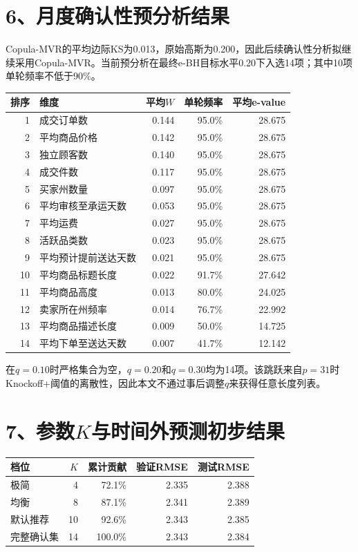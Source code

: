 \documentclass[UTF8,12pt,a4paper]{ctexart}
\begin{document}
\newpage
\section*{6、月度确认性预分析结果}

Copula-MVR的平均边际KS为0.013，原始高斯为0.200，因此后续确认性分析拟继续采用Copula-MVR。当前预分析在最终e-BH目标水平0.20下入选14项；其中10项单轮频率不低于90\%。

\begin{center}
\scriptsize
\renewcommand{\arraystretch}{1.12}
\begin{tabular}{r l r r r}
\toprule
排序 & 维度 & 平均$W$ & 单轮频率 & 平均e-value\\
\midrule
1 & 成交订单数 & 0.144 & 95.0\% & 28.675\\
2 & 平均商品价格 & 0.142 & 95.0\% & 28.675\\
3 & 独立顾客数 & 0.140 & 95.0\% & 28.675\\
4 & 成交件数 & 0.117 & 95.0\% & 28.675\\
5 & 买家州数量 & 0.097 & 95.0\% & 28.675\\
6 & 平均审核至承运天数 & 0.053 & 95.0\% & 28.675\\
7 & 平均运费 & 0.027 & 95.0\% & 28.675\\
8 & 活跃品类数 & 0.023 & 95.0\% & 28.675\\
9 & 平均预计提前送达天数 & 0.021 & 95.0\% & 28.675\\
10 & 平均商品标题长度 & 0.022 & 91.7\% & 27.642\\
11 & 平均商品高度 & 0.013 & 80.0\% & 24.025\\
12 & 卖家所在州频率 & 0.014 & 76.7\% & 22.992\\
13 & 平均商品描述长度 & 0.009 & 50.0\% & 14.725\\
14 & 平均下单至送达天数 & 0.007 & 41.7\% & 12.142\\
\bottomrule
\end{tabular}
\end{center}

在$q=0.10$时严格集合为空，$q=0.20$和$q=0.30$均为14项。该跳跃来自$p=31$时Knockoff+阈值的离散性，因此本文不通过事后调整$q$来获得任意长度列表。

\newpage
\section*{7、参数$K$与时间外预测初步结果}

\begin{center}
\small
\begin{tabular}{lrrrr}
\toprule
档位 & $K$ & 累计贡献 & 验证RMSE & 测试RMSE\\
\midrule
极简 & 4 & 72.1\% & 2.335 & 2.388\\
均衡 & 8 & 87.1\% & 2.341 & 2.389\\
默认推荐 & 10 & 92.6\% & 2.343 & 2.385\\
完整确认集 & 14 & 100.0\% & 2.343 & 2.384\\
\bottomrule
\end{tabular}
\end{center}
\end{document}
